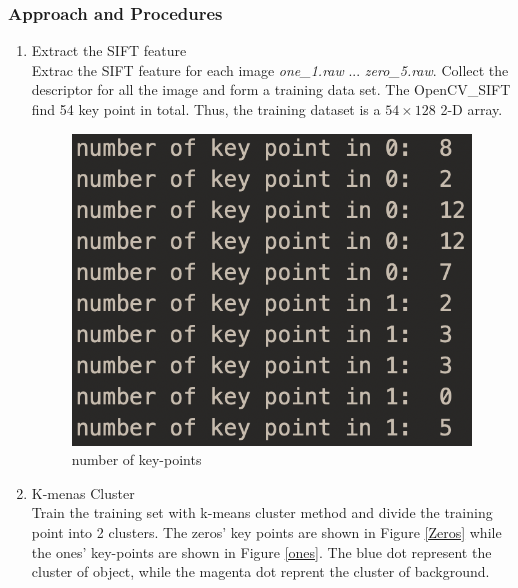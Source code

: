 \documentclass[11pt]{article}
\begin{document}
\subsubsection{Approach and Procedures}
\begin{enumerate}
\item Extract the SIFT feature\\
Extrac the SIFT feature for each image {\it one\_1.raw} ... {\it zero\_5.raw}. Collect the descriptor for all the image and form a training data set. The OpenCV\_SIFT find 54 key point in total. Thus, the training dataset is a $54 \times 128$ 2-D array.

\begin{figure}[!htp]
	\centering
	\includegraphics[scale=0.4]{trainset.png}
	\caption{number of key-points}
	\end{figure}
\item K-menas Cluster\\
Train the training set with k-means cluster method and divide the training point into 2 clusters. The zeros' key points are shown in Figure \ref{Zeros} while the ones' key-points are shown in Figure \ref{ones}. The blue dot represent the cluster of object, while the magenta dot reprent the cluster of background.



\begin{figure}[!htbp]
\centering    
 

\end{figure}
\end{enumerate}
\end{document}
